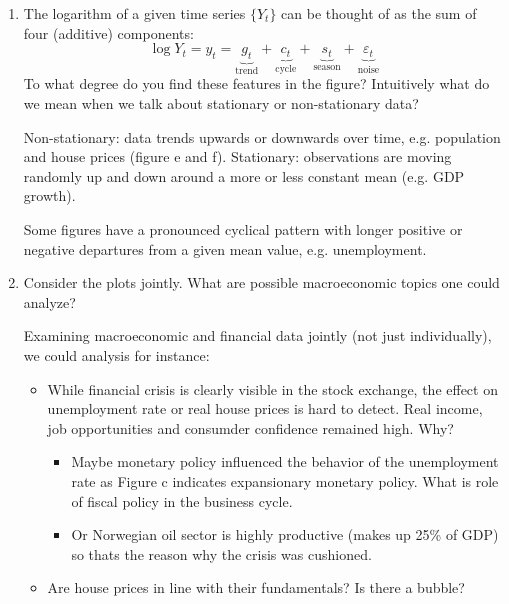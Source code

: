 \documentclass[a4paper]{scrartcl}
\begin{document}
\begin{enumerate}
\begin{enumerate}
                  \item The logarithm of a given time series $\{Y_t\}$ can be thought of as the sum of four (additive) components:
                        $$ \log{Y_t} =y_t = \underbrace{g_t}_\text{trend} + \underbrace{c_t}_\text{cycle} + \underbrace{s_t}_\text{season} + \underbrace{\varepsilon_t}_\text{noise}$$
                        To what degree do you find these features in the figure? Intuitively what do we mean when we talk about stationary or non-stationary data?
                        \begin{solution}
                            Non-stationary: data trends upwards or downwards over time, e.g. population and house prices (figure e and f). Stationary: observations are moving randomly up and down around a more or less constant mean (e.g. GDP growth).
                            
                            Some figures have a pronounced cyclical pattern with longer positive or negative departures from a given mean value, e.g. unemployment.
                        \end{solution}
                  \item Consider the plots jointly. What are possible macroeconomic topics one could analyze?
                        \begin{solution}
                            Examining macroeconomic and financial data jointly (not just individually), we could analysis for instance:
                            \begin{itemize}
                                \item While financial crisis is clearly visible in the stock exchange, the effect on unemployment rate or real house prices is hard to detect. Real income, job opportunities and consumder confidence remained high. Why?
                                      \begin{itemize} 
                                          \item Maybe monetary policy influenced the behavior of the unemployment rate as Figure c indicates expansionary monetary policy. What is role of fiscal policy in the business cycle.
                                          \item Or Norwegian oil sector is highly productive (makes up 25\% of GDP) so thats the reason why the crisis was cushioned.
                                      \end{itemize}
                                \item Are house prices in line with their fundamentals? Is there a bubble?
                            \end{itemize}
                            \newpage
                        \end{solution}
              \end{enumerate}
              
    \end{enumerate}
    \newpage
    
\end{document}
